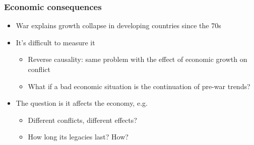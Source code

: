 \documentclass[aspectratio=43]{beamer}
\begin{document}
\begin{frame}
\frametitle{Economic consequences}
\centering

\begin{itemize}[<+->]
  \item War explains growth collapse in developing countries since the 70s
  \item It's difficult to measure it
  \begin{itemize}
    \item Reverse causality: same problem with the effect of economic growth on conflict
    \item What if a bad economic situation is the continuation of pre-war trends?
  \end{itemize}
  \item The question is {} it affects the economy, e.g.
  \begin{itemize}
    \item Different conflicts, different effects?
    \item How long its legacies last? How?
  \end{itemize}
\end{itemize}

\end{frame}


\end{document}
